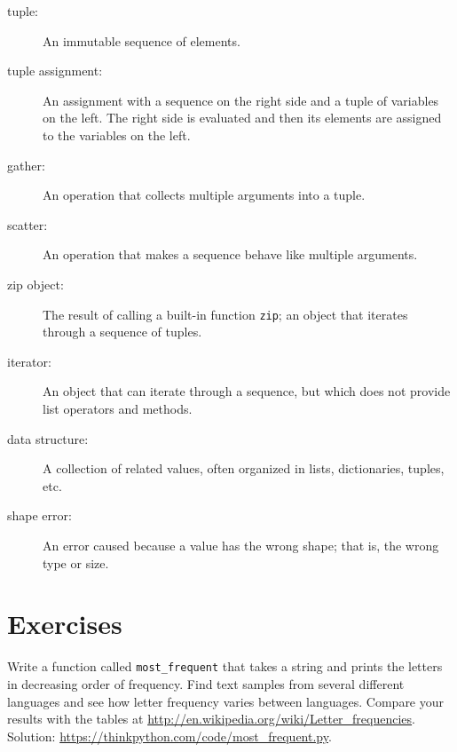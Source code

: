 \documentclass[10pt]{book}
\begin{document}
\begin{description}

\item[tuple:] An immutable sequence of elements.

\item[tuple assignment:] An assignment with a sequence on the
right side and a tuple of variables on the left.  The right
side is evaluated and then its elements are assigned to the
variables on the left.

\item[gather:] An operation that collects multiple arguments into a tuple.

\item[scatter:] An operation that makes a sequence behave like multiple arguments.

\item[zip object:] The result of calling a built-in function {\tt zip};
an object that iterates through a sequence of tuples.

\item[iterator:] An object that can iterate through a sequence, but
which does not provide list operators and methods.

\item[data structure:] A collection of related values, often
organized in lists, dictionaries, tuples, etc.

\item[shape error:] An error caused because a value has the
wrong shape; that is, the wrong type or size.

\end{description}


\section{Exercises}

\begin{exercise}

Write a function called \verb"most_frequent" that takes a string and
prints the letters in decreasing order of frequency.  Find text
samples from several different languages and see how letter frequency
varies between languages.  Compare your results with the tables at
\url{http://en.wikipedia.org/wiki/Letter_frequencies}.  Solution:
\url{https://thinkpython.com/code/most_frequent.py}.   

\end{exercise}
\end{document}
